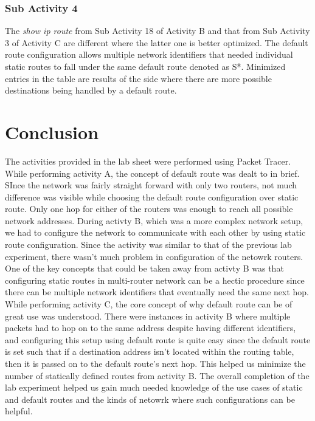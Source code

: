 \documentclass{lab_sheet}
\begin{document}
  \subsubsection*{Sub Activity 4}
  The \textit{show ip route} from Sub Activity 18 of Activity B and that from Sub Activity 3 of Activity C are different where the latter one is better optimized. The default route configuration allows multiple network identifiers that needed individual static routes to fall under the same default route denoted as S*. Minimized entries in the table are results of the side where there are more possible destinations being handled by a default route.


  \section{Conclusion}
  The activities provided in the lab sheet were performed using Packet Tracer. While performing activity A, the concept of default route was dealt to in brief. SInce the network was fairly straight forward with only two routers, not much difference was visible while choosing the default route configuration over static route. Only one hop for either of the routers was enough to reach all possible network addresses. During activty B, which was a more complex network setup, we had to configure the network to communicate with each other by using static route configuration. Since the activity was similar to that of the previous lab experiment, there wasn't much problem in configuration of the netowrk routers. One of the key concepts that could be taken away from activty B was that configuring static routes in multi-router network can be a hectic procedure since there can be multiple network identifiers that eventually need the same next hop. While performing activity C, the core concept of why default route can be of great use was understood. There were instances in activity B where multiple packets had to hop on to the same address despite having different identifiers, and configuring this setup using default route is quite easy since the default route is set such that if a destination address isn't located within the routing table, then it is passed on to the default route's next hop. This helped us minimize the number of statically defined routes from activity B. The overall completion of the lab experiment helped us gain much needed knowledge of the use cases of static and default routes and the kinds of netowrk where such configurations can be helpful.
\end{document}

